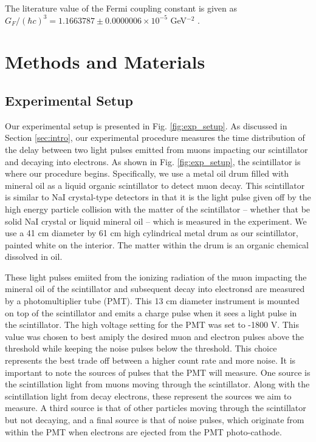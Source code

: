 \documentclass[
    aps, 
    twocolumn, 
    secnumarabic, 
    balancelastpage, 
    amsmath, 
    amssymb, 
    nofootinbib, 
    floatfix
]{revtex4-2}
\begin{document}
The literature value of the Fermi coupling constant is given as $G_F/(\hbar c)^{3} =  1.1663787 \pm 0.000 0006 \times 10^{-5}$ GeV$^{-2}$ \cite{nistFermi}.  

\section{Methods and Materials}

\subsection{Experimental Setup}
\label{sec:expSetup}

Our experimental setup is presented in Fig. \ref{fig:exp_setup}. As discussed in Section \ref{sec:intro}, our experimental procedure measures the time distribution of the delay between two light pulses emitted from muons impacting our scintillator and decaying into electrons. As shown in Fig. \ref{fig:exp_setup}, the scintillator is where our procedure begins. Specifically, we use a metal oil drum filled with mineral oil as a liquid organic scintillator to detect muon decay. This scintillator is similar to NaI crystal-type detectors in that it is the light pulse given off by the high energy particle collision with the matter of the scintillator -- whether that be solid NaI crystal or liquid mineral oil -- which is measured in the experiment. We use a 41 cm diameter by 61 cm high cylindrical metal drum as our scintillator, painted white on the interior. The matter within the drum is an organic chemical dissolved in oil.  

These light pulses emiited from the ionizing radiation of the muon impacting the mineral oil of the scintillator and subsequent decay into electronsd are measured by a photomultiplier tube (PMT). This 13 cm diameter instrument is mounted on top of the scintillator and emits a charge pulse when it sees a light pulse in the scintillator. The high voltage setting for the PMT was set to -1800 V. This value was chosen to best amiply the desired muon and electron pulses above the threshold while keeping the noise pulses below the threshold. This choice represents the best trade off between a higher count rate and more noise. It is important to note the sources of pulses that the PMT will measure. One source is the scintillation light from muons moving through the scintillator. Along with the scintillation light from decay electrons, these represent the sources we aim to measure. A third source is that of other particles moving through the scintillator but not decaying, and a final source is that of noise pulses, which originate from within the PMT when electrons are ejected from the PMT photo-cathode. 
\end{document}
